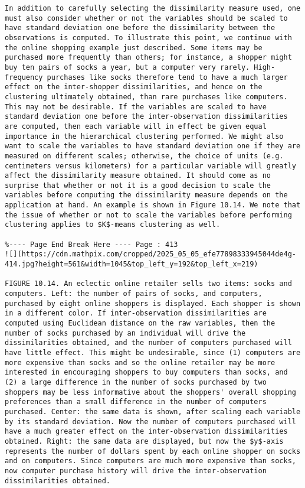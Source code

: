 \documentclass[10pt]{article}
\begin{document}
\begin{verbatim}
In addition to carefully selecting the dissimilarity measure used, one must also consider whether or not the variables should be scaled to have standard deviation one before the dissimilarity between the observations is computed. To illustrate this point, we continue with the online shopping example just described. Some items may be purchased more frequently than others; for instance, a shopper might buy ten pairs of socks a year, but a computer very rarely. High-frequency purchases like socks therefore tend to have a much larger effect on the inter-shopper dissimilarities, and hence on the clustering ultimately obtained, than rare purchases like computers. This may not be desirable. If the variables are scaled to have standard deviation one before the inter-observation dissimilarities are computed, then each variable will in effect be given equal importance in the hierarchical clustering performed. We might also want to scale the variables to have standard deviation one if they are measured on different scales; otherwise, the choice of units (e.g. centimeters versus kilometers) for a particular variable will greatly affect the dissimilarity measure obtained. It should come as no surprise that whether or not it is a good decision to scale the variables before computing the dissimilarity measure depends on the application at hand. An example is shown in Figure 10.14. We note that the issue of whether or not to scale the variables before performing clustering applies to $K$-means clustering as well.

%---- Page End Break Here ---- Page : 413
![](https://cdn.mathpix.com/cropped/2025_05_05_efe77898333945044de4g-414.jpg?height=561&width=1045&top_left_y=192&top_left_x=219)

FIGURE 10.14. An eclectic online retailer sells two items: socks and computers. Left: the number of pairs of socks, and computers, purchased by eight online shoppers is displayed. Each shopper is shown in a different color. If inter-observation dissimilarities are computed using Euclidean distance on the raw variables, then the number of socks purchased by an individual will drive the dissimilarities obtained, and the number of computers purchased will have little effect. This might be undesirable, since (1) computers are more expensive than socks and so the online retailer may be more interested in encouraging shoppers to buy computers than socks, and (2) a large difference in the number of socks purchased by two shoppers may be less informative about the shoppers' overall shopping preferences than a small difference in the number of computers purchased. Center: the same data is shown, after scaling each variable by its standard deviation. Now the number of computers purchased will have a much greater effect on the inter-observation dissimilarities obtained. Right: the same data are displayed, but now the $y$-axis represents the number of dollars spent by each online shopper on socks and on computers. Since computers are much more expensive than socks, now computer purchase history will drive the inter-observation dissimilarities obtained.


\end{verbatim}
\end{document}
